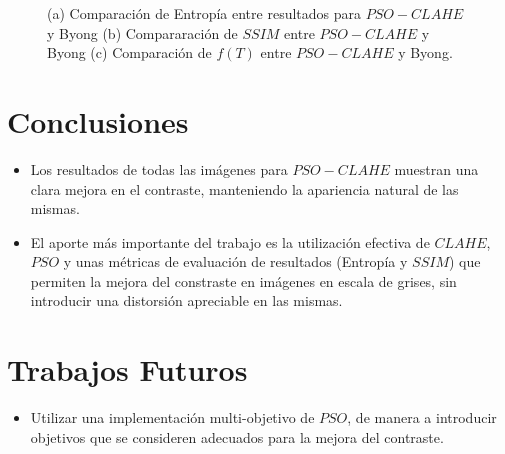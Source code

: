 \documentclass[a0,landscape,spanish]{a0poster}
\begin{document}
\begin{multicols}{3}
\begin{figure}[H]
  
  \caption{(a) Comparación de Entropía entre resultados para $PSO-CLAHE$ y Byong (b) Compararación de $SSIM$ entre $PSO-CLAHE$ y Byong (c) Comparación de $f(T)$ entre $PSO-CLAHE$ y Byong.}
\label{fig:resultado_metricas}
\end{figure}




\color{DarkSlateGray} %


\section*{Conclusiones}

\begin{itemize} \justifying


\item Los resultados de todas las imágenes para $PSO-CLAHE$ muestran una clara mejora en el contraste, manteniendo la apariencia natural de las mismas.



\item El aporte más importante del trabajo es la utilización efectiva  de $CLAHE$, $PSO$ y unas métricas de evaluación de resultados (Entropía y $SSIM$) que permiten la mejora del constraste en imágenes en escala de grises, sin introducir una distorsión apreciable en las mismas. 


\end{itemize} 



\section*{Trabajos Futuros}


\begin{itemize}\justifying

\item Utilizar una implementación multi-objetivo de $PSO$, de manera a introducir objetivos que se consideren adecuados para la mejora del contraste.


\end{itemize}
\end{multicols}
\end{document}
